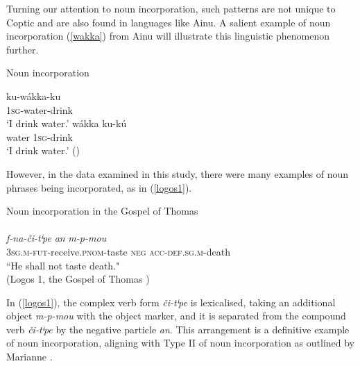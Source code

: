 \documentclass[output=paper,colorlinks,citecolor=brown ,chinesefont]{langscibook}
\begin{document}
Turning our attention to noun incorporation, such patterns are not unique to Coptic and are also found in languages like Ainu. A salient example of noun incorporation (\ref{wakka}) from Ainu will illustrate this linguistic phenomenon further. 

\begin{exe}
    \ex Noun incorporation 
    \begin{xlist}
        \ex\label{wakka} 
        \settowidth {}
        \gll ku-wákka-ku \\ 
        1\textsc{sg}-water-drink \\ 
        \glt ‘I drink water.'
        \ex\label{kuku} 
        \settowidth {}
        \gll wákka	ku-kú \\ 
        water	1\textsc{sg}-drink \\ 
        \glt ‘I drink water.'
        \hspace*{\fill}(\citealt[198]{sato})
    \end{xlist}
\end{exe}

However, in the data examined in this study, there were many examples of noun phrases being incorporated, as in (\ref{logos1}).

\begin{exe}
    \ex\label{logos1} Noun incorporation in the Gospel of Thomas \\
\glll {} 			 		\\
\textit{f-na-či-tⁱpe}			\textit{an}		\textit{m-p-mou} \\
3\textsc{sg}.\textsc{m}-\textsc{fut}-receive.\textsc{pnom}-taste	\textsc{neg} 		\textsc{acc}-\textsc{def}.\textsc{sg}.\textsc{m}-death \\
\glt “He shall not taste death." \\
 \hspace*{\fill}(Logos 1, the Gospel of Thomas \citep{layton2})
\end{exe}


In (\ref{logos1}), the complex verb form  \textit{či-tⁱpe} is lexicalised, taking an additional object  \textit{m-p-mou} with the object marker, and it is separated from the compound verb  \textit{či-tⁱpe} by the negative particle  \textit{an}. This arrangement is a definitive example of noun incorporation, aligning with Type II of noun incorporation as outlined by Marianne \citet{mithun}.
\end{document}
